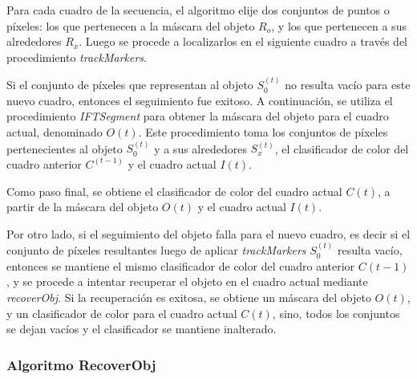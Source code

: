Para cada cuadro de la secuencia, el algoritmo elije dos conjuntos de puntos o píxeles: los que pertenecen a la máscara del objeto $R_{o}$, y los que pertenecen a
sus alrededores $R_{x}$. Luego se procede
a localizarlos en el siguiente cuadro a través del procedimiento \textit{trackMarkers}.

Si el conjunto de píxeles que representan al objeto $S_{0}^{(t)}$ no resulta
vacío para este nuevo cuadro, entonces el seguimiento fue exitoso. A
continuación, se utiliza el procedimiento
\textit{IFTSegment} para obtener la máscara del objeto para el cuadro actual,
denominado $O{(t)}$. Este procedimiento toma los conjuntos de píxeles pertenecientes al objeto $S_{0}^{(t)}$ y
a sus alrededores $S_{x}^{(t)}$, el clasificador de color del cuadro anterior $C^{(t-1)}$ y el
cuadro actual $I{(t)}$.

Como paso final, se obtiene el clasificador de color del cuadro actual $C{(t)}$, a partir de la máscara del objeto $O{(t)}$ y el cuadro actual $I{(t)}$.

Por otro lado, si el seguimiento del objeto falla para el nuevo cuadro, es decir si el conjunto de píxeles resultantes luego de aplicar \textit{trackMarkers} $S_{0}^{(t)}$
resulta vacío, entonces se mantiene el mismo clasificador de color del cuadro anterior $C{(t-1)}$, y se procede
a intentar recuperar el objeto en el cuadro actual mediante \textit{recoverObj}. Si la recuperación
es exitosa, se obtiene un máscara del objeto $O{(t)}$, y un clasificador de color para el cuadro actual $C{(t)}$,
sino, todos los conjuntos se dejan vacíos y el clasificador se mantiene inalterado.\

\subsubsection{Algoritmo RecoverObj}

